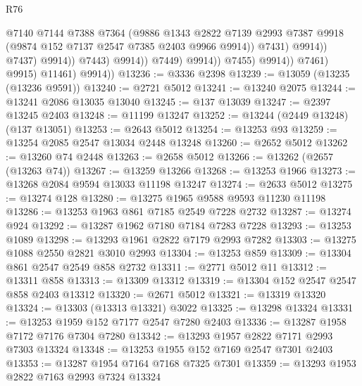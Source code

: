 \begin{lexlean}{R76}
\begin{coremodule}
                                            @7140
                                            @7144
                                            @7388
                                            @7364
                                            (@9886
                                              @1343
                                              @2822
                                              @7139
                                              @2993
                                              @7387
                                              @9918
                                              (@9874 @152 @7137 @2547 @7385 @2403 @9966 @9914))
                                            @7431)
                                          @9914))
                                      @7437)
                                    @9914))
                                @7443)
                              @9914))
                          @7449)
                        @9914))
                    @7455)
                  @9914))
              @7461)
            @9915)
          @11461)
        @9914))
@13236 := @3336 @2398
@13239 := @13059 (@13235 (@13236 @9591))
@13240 := @2721 @5012
@13241 := @13240 @2075
@13244 := @13241 @2086 @13035 @13040
@13245 := @137 @13039
@13247 := @2397 @13245 @2403
@13248 := @11199 @13247
@13252 := @13244 (@2449 @13248) (@137 @13051)
@13253 := @2643 @5012
@13254 := @13253 @93
@13259 := @13254 @2085 @2547 @13034 @2448 @13248
@13260 := @2652 @5012
@13262 := @13260 @74 @2448
@13263 := @2658 @5012
@13266 := @13262 (@2657 (@13263 @74))
@13267 := @13259 @13266
@13268 := @13253 @1966
@13273 := @13268 @2084 @9594 @13033 @11198 @13247
@13274 := @2633 @5012
@13275 := @13274 @128
@13280 := @13275 @1965 @9588 @9593 @11230 @11198
@13286 := @13253 @1963 @861 @7185 @2549 @7228 @2732
@13287 := @13274 @924
@13292 := @13287 @1962 @7180 @7184 @7283 @7228
@13293 := @13253 @1089
@13298 := @13293 @1961 @2822 @7179 @2993 @7282
@13303 := @13275 @1088 @2550 @2821 @3010 @2993
@13304 := @13253 @859
@13309 := @13304 @861 @2547 @2549 @858 @2732
@13311 := @2771 @5012 @11
@13312 := @13311 @858
@13313 := @13309 @13312
@13319 := @13304 @152 @2547 @2547 @858 @2403 @13312
@13320 := @2671 @5012
@13321 := @13319 @13320
@13324 := @13303 (@13313 @13321) @3022
@13325 := @13298 @13324
@13331 := @13253 @1959 @152 @7177 @2547 @7280 @2403
@13336 := @13287 @1958 @7172 @7176 @7304 @7280
@13342 := @13293 @1957 @2822 @7171 @2993 @7303 @13324
@13348 := @13253 @1955 @152 @7169 @2547 @7301 @2403
@13353 := @13287 @1954 @7164 @7168 @7325 @7301
@13359 := @13293 @1953 @2822 @7163 @2993 @7324 @13324

\end{coremodule}
\end{lexlean}
